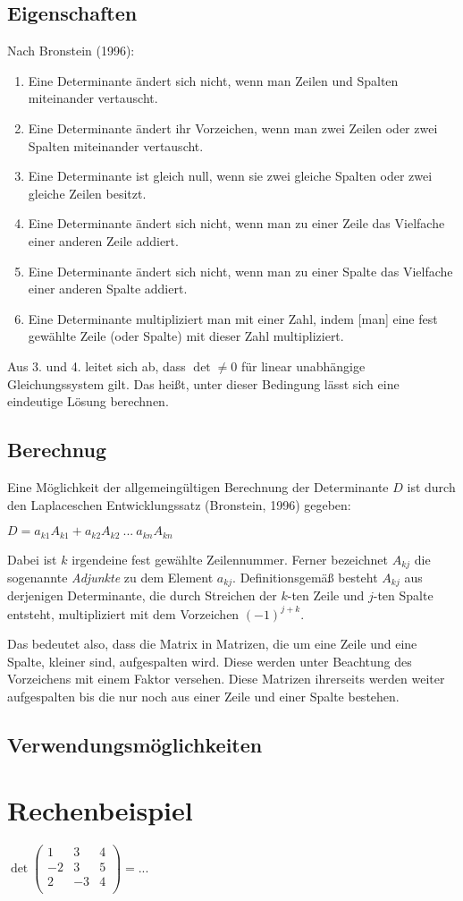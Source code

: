\documentclass[11pt,a4paper]{article}
\begin{document}
\subsection{Eigenschaften}
Nach Bronstein (1996):
\begin{enumerate}
	\item Eine Determinante ändert sich nicht, wenn man Zeilen und Spalten miteinander vertauscht.
	\item Eine Determinante ändert ihr Vorzeichen, wenn man zwei Zeilen oder zwei Spalten miteinander vertauscht.
	\item Eine Determinante ist gleich null, wenn sie zwei gleiche Spalten oder zwei gleiche Zeilen besitzt.
	\item Eine Determinante ändert sich nicht, wenn man zu einer Zeile das Vielfache einer anderen Zeile addiert.
	\item Eine Determinante ändert sich nicht, wenn man zu einer Spalte das Vielfache einer anderen Spalte addiert.
	\item Eine Determinante multipliziert man mit einer Zahl, indem [man] eine fest gewählte Zeile (oder Spalte) mit dieser Zahl multipliziert.
\end{enumerate}

Aus 3. und 4. leitet sich ab, dass $\det \neq 0$ für linear unabhängige Gleichungssystem gilt. Das heißt, unter dieser Bedingung lässt sich eine eindeutige Lösung berechnen.

\subsection{Berechnug}
Eine Möglichkeit der allgemeingültigen Berechnung der Determinante $D$ ist durch den Laplaceschen Entwicklungssatz (Bronstein, 1996) gegeben:

$D = a_{k1} A_{k1} + a_{k2} A_{k2} ~...~ a_{kn} A_{kn}$

Dabei ist $k$ irgendeine fest gewählte Zeilennummer. Ferner bezeichnet $A_{kj}$ die sogenannte \textit{Adjunkte} zu dem Element $a_{kj}$. Definitionsgemäß besteht $A_{kj}$ aus derjenigen Determinante, die durch Streichen der $k$-ten Zeile und $j$-ten Spalte entsteht, multipliziert mit dem Vorzeichen $(-1)^{j+k}$.

Das bedeutet also, dass die Matrix in Matrizen, die um eine Zeile und eine Spalte, kleiner sind, aufgespalten wird. Diese werden unter Beachtung des Vorzeichens mit einem Faktor versehen. Diese Matrizen ihrerseits werden weiter aufgespalten bis die nur noch aus einer Zeile und einer Spalte bestehen.

\subsection{Verwendungsmöglichkeiten}

\section{Rechenbeispiel}
$
\det
\left(
	\begin{array}{rrr}
	1 & 3 & 4\\
	-2 & 3 & 5\\
	2 & -3 & 4\\
	\end{array}
\right)
= ...
$
\end{document}
